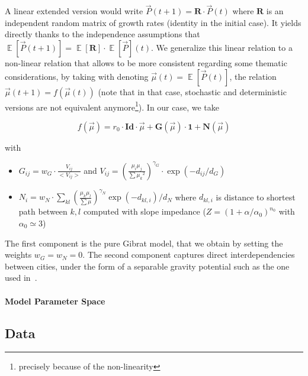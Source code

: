 \documentclass[Royal,sageh,times]{sagej}
\DeclareMathOperator{\E}{\mathbb{E}}
\newcommand{\Eb}[1]{\ensuremath{\E\!\left[#1\right]}}
\begin{document}
A linear extended version would write $\vec{P}(t+1)=\mathbf{R}\cdot \vec{P}(t)$ where $\mathbf{R}$ is an independent random matrix of growth rates (identity in the initial case). It yields directly thanks to the independence assumptions that $\Eb{\vec{P}(t+1)}=\Eb{\mathbf{R}}\cdot\Eb{\vec{P}}(t)$. We generalize this linear relation to a non-linear relation that allows to be more consistent regarding some thematic considerations, by taking with denoting $\vec{\mu}(t)=\Eb{\vec{P}(t)}$, the relation $\vec{\mu}(t+1)=f(\vec{\mu}(t))$ (note that in that case, stochastic and deterministic versions are not equivalent anymore\footnote{precisely because of the non-linearity %
}). 
In our case, we take

\begin{equation}
f(\vec{\mu}) = r_0\cdot \mathbf{Id}\cdot \vec{\mu} + \mathbf{G}\left(\vec{\mu}\right)\cdot \mathbf{1} + \mathbf{N}\left(\vec{\mu}\right)
\end{equation}

with 
\begin{itemize}
\item $G_{ij} = w_G\cdot \frac{V_{ij}}{<V_{ij}>}$ and $V_{ij} = \left(\frac{\mu_i\mu_j}{\sum{\mu_k}^2}\right)^{\gamma_G}\cdot \exp{(-d_{ij}/d_G)}$
\item $N_{i} = w_N \cdot \sum_{kl} \left(\frac{\mu_k\mu_l}{\sum\mu}\right)^{\gamma_N}\exp{(-d_{kl,i})/d_N}$ where $d_{kl,i}$ is distance to shortest path between $k,l$ computed with slope impedance ($Z=\left(1+\alpha/\alpha_0\right)^{n_0}$ with $\alpha_0\simeq 3$)
\end{itemize}

The first component is the pure Gibrat model, that we obtain by setting the weights $w_G = w_N = 0$. The second component captures direct interdependencies between cities, under the form of a separable gravity potential such as the one used in~\cite{sanders1992systeme}.


\paragraph{Model Parameter Space}





\subsection{Data}
\end{document}

